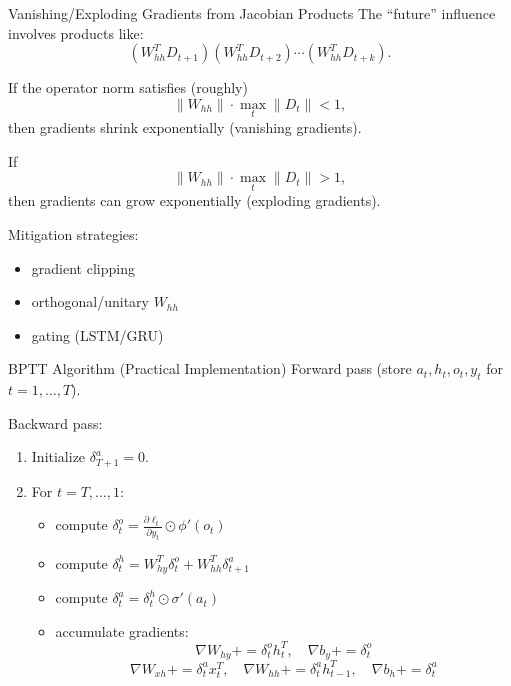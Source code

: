 \documentclass{beamer}
\begin{document}
\begin{frame}{Vanishing/Exploding Gradients from Jacobian Products}
  The ``future'' influence involves products like:
  \[
  (W_{hh}^T D_{t+1})(W_{hh}^T D_{t+2})\cdots (W_{hh}^T D_{t+k}).
  \]

  If the operator norm satisfies (roughly)
  \[
  \|W_{hh}\|\cdot \max_t\|D_t\| < 1,
  \]
  then gradients shrink exponentially (vanishing gradients).

  If
  \[
  \|W_{hh}\|\cdot \max_t\|D_t\| > 1,
  \]
  then gradients can grow exponentially (exploding gradients).

  Mitigation strategies:
  \begin{itemize}
  \item gradient clipping
  \item orthogonal/unitary \(W_{hh}\)
  \item gating (LSTM/GRU)
  \end{itemize}
\end{frame}

\begin{frame}{BPTT Algorithm (Practical Implementation)}
  Forward pass (store \(a_t,h_t,o_t,y_t\) for \(t=1,\dots,T\)).

  Backward pass:
  \begin{enumerate}
  \item Initialize \(\delta^a_{T+1}=0\).
  \item For \(t=T,\dots,1\):
    \begin{itemize}
    \item compute \(\delta^o_t=\frac{\partial \ell_t}{\partial y_t}\odot\phi'(o_t)\)
    \item compute \(\delta^h_t = W_{hy}^T\delta^o_t + W_{hh}^T\delta^a_{t+1}\)
    \item compute \(\delta^a_t = \delta^h_t \odot \sigma'(a_t)\)
    \item accumulate gradients:
      \[
      \nabla W_{hy} {+}{=} \delta^o_t h_t^T,\quad
      \nabla b_y {+}{=} \delta^o_t
      \]
      \[
      \nabla W_{xh} {+}{=} \delta^a_t x_t^T,\quad
      \nabla W_{hh} {+}{=} \delta^a_t h_{t-1}^T,\quad
      \nabla b_h {+}{=} \delta^a_t
      \]
    \end{itemize}
  \end{enumerate}
\end{frame}
\end{document}
